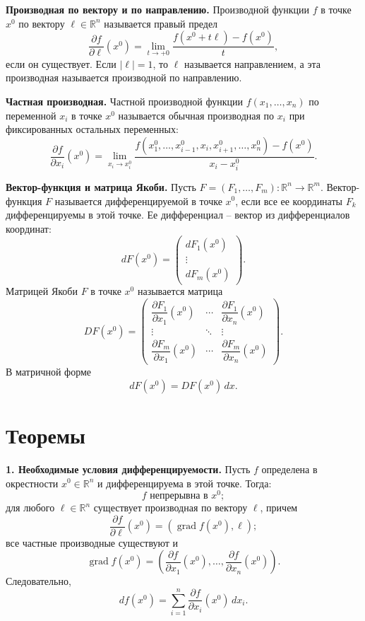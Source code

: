 \documentclass[12pt,a4paper]{article}
\newcommand{\R}{\mathbb{R}}
\newcommand{\grad}{\operatorname{grad}}
\newcommand{\Jac}{D}
\begin{document}
\textbf{Производная по вектору и по направлению.}
Производной функции \(f\) в точке \(x^0\) по вектору \(\ell\in\R^n\)
называется правый предел
\[
  \frac{\partial f}{\partial \ell}(x^0)
  =
  \lim_{t\to+0}\frac{f(x^0+t\ell)-f(x^0)}{t},
\]
если он существует. Если \(|\ell|=1\), то \(\ell\) называется направлением, а
эта производная называется производной по направлению.

\textbf{Частная производная.}
Частной производной функции \(f(x_1,\dots,x_n)\) по переменной \(x_i\) в точке
\(x^0\) называется обычная производная по \(x_i\) при фиксированных остальных
переменных:
\[
  \frac{\partial f}{\partial x_i}(x^0)
  =
  \lim_{x_i\to x_i^0}
  \frac{
    f(x_1^0,\dots,x_{i-1}^0,x_i,x_{i+1}^0,\dots,x_n^0)-f(x^0)
  }{x_i-x_i^0}.
\]

\textbf{Вектор-функция и матрица Якоби.}
Пусть \(F=(F_1,\dots,F_m):\R^n\to\R^m\). Вектор-функция \(F\) называется
дифференцируемой в точке \(x^0\), если все ее координаты \(F_k\)
дифференцируемы в этой точке. Ее дифференциал -- вектор из дифференциалов
координат:
\[
  dF(x^0)=
  \begin{pmatrix}
    dF_1(x^0)\\
    \vdots\\
    dF_m(x^0)
  \end{pmatrix}.
\]
Матрицей Якоби \(F\) в точке \(x^0\) называется матрица
\[
  \Jac F(x^0)=
  \begin{pmatrix}
    \dfrac{\partial F_1}{\partial x_1}(x^0) & \cdots &
    \dfrac{\partial F_1}{\partial x_n}(x^0)\\
    \vdots & \ddots & \vdots\\
    \dfrac{\partial F_m}{\partial x_1}(x^0) & \cdots &
    \dfrac{\partial F_m}{\partial x_n}(x^0)
  \end{pmatrix}.
\]
В матричной форме
\[
  dF(x^0)=\Jac F(x^0)\,dx.
\]

\section*{Теоремы}

\textbf{1. Необходимые условия дифференцируемости.}
Пусть \(f\) определена в окрестности \(x^0\in\R^n\) и дифференцируема в этой
точке. Тогда:
\[
  f \text{ непрерывна в } x^0;
\]
для любого \(\ell\in\R^n\) существует производная по вектору \(\ell\), причем
\[
  \frac{\partial f}{\partial \ell}(x^0)
  =
  (\grad f(x^0),\ell);
\]
все частные производные существуют и
\[
  \grad f(x^0)=
  \left(
    \frac{\partial f}{\partial x_1}(x^0),\dots,
    \frac{\partial f}{\partial x_n}(x^0)
  \right).
\]
Следовательно,
\[
  df(x^0)=\sum_{i=1}^n\frac{\partial f}{\partial x_i}(x^0)\,dx_i.
\]
\end{document}
